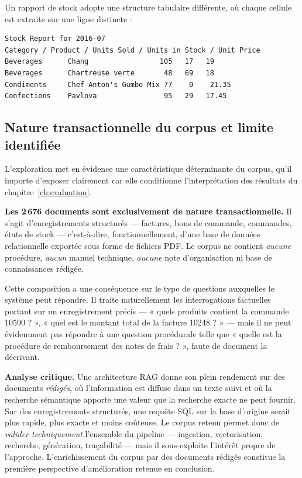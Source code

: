 Un rapport de stock adopte une structure tabulaire différente, où chaque cellule
est extraite sur une ligne distincte :

\begin{lstlisting}[style=plain,caption={Extrait d'un rapport de stock (\texttt{StockReport\_2016-07.pdf})}]
Stock Report for 2016-07
Category / Product / Units Sold / Units in Stock / Unit Price
Beverages      Chang                 105   17   19
Beverages      Chartreuse verte       48   69   18
Condiments     Chef Anton's Gumbo Mix 77    0    21.35
Confections    Pavlova                95   29   17.45
\end{lstlisting}

\subsection{Nature transactionnelle du corpus et limite identifiée}
\label{sec:limite-corpus}

L'exploration met en évidence une caractéristique déterminante du corpus, qu'il
importe d'exposer clairement car elle conditionne l'interprétation des résultats
du chapitre~\ref{ch:evaluation}.

\textbf{Les 2\,676 documents sont exclusivement de nature transactionnelle.} Il
s'agit d'enregistrements structurés --- factures, bons de commande, commandes,
états de stock --- c'est-à-dire, fonctionnellement, d'une base de données
relationnelle exportée sous forme de fichiers PDF. Le corpus ne contient
\emph{aucune} procédure, \emph{aucun} manuel technique, \emph{aucune} note
d'organisation ni base de connaissances rédigée.

Cette composition a une conséquence sur le type de questions auxquelles le
système peut répondre. Il traite naturellement les interrogations factuelles
portant sur un enregistrement précis --- « quels produits contient la commande
10590 ? », « quel est le montant total de la facture 10248 ? » --- mais il ne
peut évidemment pas répondre à une question procédurale telle que « quelle est
la procédure de remboursement des notes de frais ? », faute de document la
décrivant.

\begin{encadre}
\textbf{Analyse critique.} Une architecture RAG donne son plein rendement sur
des documents \emph{rédigés}, où l'information est diffuse dans un texte suivi
et où la recherche sémantique apporte une valeur que la recherche exacte ne
peut fournir. Sur des enregistrements structurés, une requête SQL sur la base
d'origine serait plus rapide, plus exacte et moins coûteuse. Le corpus retenu
permet donc de \emph{valider techniquement} l'ensemble du pipeline --- ingestion,
vectorisation, recherche, génération, traçabilité --- mais il sous-exploite
l'intérêt propre de l'approche. L'enrichissement du corpus par des documents
rédigés constitue la première perspective d'amélioration retenue en conclusion.
\end{encadre}

